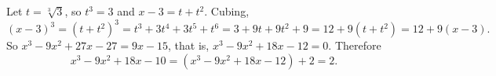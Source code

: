 Let $t=\sqrt[3]{3}$, so $t^3=3$ and $x-3=t+t^2$. Cubing,
\[
(x-3)^3=(t+t^2)^3=t^3+3t^4+3t^5+t^6=3+9t+9t^2+9=12+9(t+t^2)=12+9(x-3).
\]
So $x^3-9x^2+27x-27=9x-15$, that is, $x^3-9x^2+18x-12=0$. Therefore
\[
x^3-9x^2+18x-10=(x^3-9x^2+18x-12)+2=\boxed{2}.
\]
